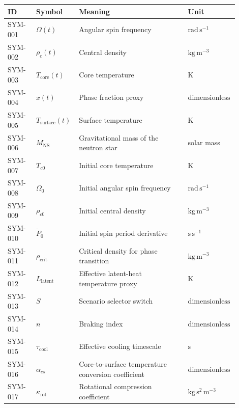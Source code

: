 \documentclass[11pt]{article}
\begin{document}
\begin{center}
\small
\begin{tabular}{|p{0.12\linewidth}|p{0.15\linewidth}|p{0.46\linewidth}|p{0.17\linewidth}|}
\hline
ID & Symbol & Meaning & Unit \\ \hline
SYM-001 & $\Omega(t)$ & Angular spin frequency & $\mathrm{rad}\,\mathrm{s}^{-1}$ \\ \hline
SYM-002 & $\rho_c(t)$ & Central density & $\mathrm{kg}\,\mathrm{m}^{-3}$ \\ \hline
SYM-003 & $T_{\mathrm{core}}(t)$ & Core temperature & $\mathrm{K}$ \\ \hline
SYM-004 & $x(t)$ & Phase fraction proxy & $\mathrm{dimensionless}$ \\ \hline
SYM-005 & $T_{\mathrm{surface}}(t)$ & Surface temperature & $\mathrm{K}$ \\ \hline
SYM-006 & $M_{\mathrm{NS}}$ & Gravitational mass of the neutron star & solar mass \\ \hline
SYM-007 & $T_{c0}$ & Initial core temperature & $\mathrm{K}$ \\ \hline
SYM-008 & $\Omega_0$ & Initial angular spin frequency & $\mathrm{rad}\,\mathrm{s}^{-1}$ \\ \hline
SYM-009 & $\rho_{c0}$ & Initial central density & $\mathrm{kg}\,\mathrm{m}^{-3}$ \\ \hline
SYM-010 & $\dot{P}_0$ & Initial spin period derivative & $\mathrm{s}\,\mathrm{s}^{-1}$ \\ \hline
SYM-011 & $\rho_{\mathrm{crit}}$ & Critical density for phase transition & $\mathrm{kg}\,\mathrm{m}^{-3}$ \\ \hline
SYM-012 & $L_{\mathrm{latent}}$ & Effective latent-heat temperature proxy & $\mathrm{K}$ \\ \hline
SYM-013 & $S$ & Scenario selector switch & $\mathrm{dimensionless}$ \\ \hline
SYM-014 & $n$ & Braking index & $\mathrm{dimensionless}$ \\ \hline
SYM-015 & $\tau_{\mathrm{cool}}$ & Effective cooling timescale & $\mathrm{s}$ \\ \hline
SYM-016 & $\alpha_{cs}$ & Core-to-surface temperature conversion coefficient & $\mathrm{dimensionless}$ \\ \hline
SYM-017 & $\kappa_{\mathrm{rot}}$ & Rotational compression coefficient & $\mathrm{kg}\,\mathrm{s}^{2}\,\mathrm{m}^{-3}$ \\ \hline
\end{tabular}
\end{center}
\end{document}
